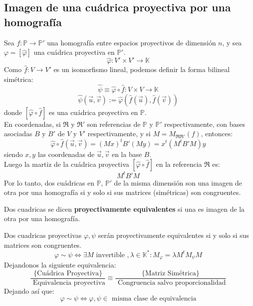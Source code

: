 \subsection{Imagen de una cuádrica proyectiva por una homografía}

Sea $f : \mathbb{P} \to \mathbb{P}'$ una homografía entre espacios proyectivos de dimensión $n$, y sea $\varphi = [\hat{\varphi}]$ una cuádrica proyectiva en $\mathbb{P}'$.
\[
    \hat{\varphi} : V' \times V' \to \mathbb{K}
\] 
Como $\hat{f} : V \to V'$ es un isomorfismo lineal, podemos definir la forma bilineal simétrica:
\[
    \hat{\psi} \equiv \hat{\varphi} \circ \hat{f} : V \times V \to \mathbb{K}
\]
\[
    \hat{\psi} (\vec{u}, \vec{v}) := \hat{\varphi} (\hat{f}(\vec{u}), \hat{f}(\vec{v}))
\]
donde $[\hat{\varphi} \circ \hat{f}]$ es una cuádrica proyectiva en $\mathbb{P}$.\\
En coordenadas, si $\mathfrak{R}$ y $\mathfrak{R}'$ son referencias de $\mathbb{P}$ y $\mathbb{P}'$ respectivamente, con bases asociadas $B$ y $B'$ de $V$ y $V'$ respectivamente, y si $M = M_{\mathfrak{R} \mathfrak{R}'} (f)$, entonces:
\[
    \hat{\varphi} \circ \hat{f} (\vec{u}, \vec{v}) = (M x)^t B' (M y) = x^t (M^t B' M) y
\]
siendo $x,y$ las coordenadas de $\vec{u}, \vec{v}$ en la base $B$.\\
Luego la martiz de la cuádrica proyectiva $[\hat{\varphi} \circ \hat{f}]$ en la referencia $\mathfrak{R}$ es:
\[
    M^t B' M
\]
Por lo tanto, dos cuádricas en $\mathbb{P}$, $\mathbb{P}'$ de la misma dimensión son una imagen de otra por una homografía si y solo si sus matrices (simétricas) son congruentes.

\begin{definición}
    Dos cuadricas se dicen \textbf{proyectivamente equivalentes} si una es imagen de la otra por una homografía.
\end{definición}

\begin{observación}
    Dos cuadricas proyectivas $\varphi, \psi$ serán proyectivamente equivalentes si y solo si sus matrices son congruentes.
    \[
        \varphi \sim \psi \iff
        \exists M \text{ invertible }, \lambda \in \mathbb{K}^* :
        M_{\varphi} = \lambda M^t M_{\psi} M
    \]
    Dejandonos la siguiente equivalencia:
    \[
        \frac{ \{ \text{Cuádrica Proyectiva} \} }{ \text{ Equivalencia proyectiva} }
        \equiv
        \frac{ \{ \text{Matriz Simétrica} \} }{ \text{ Congruencia salvo proporcionalidad} }
    \]
    Dejando así que:
    \[
    \varphi \sim \psi \iff
    \varphi, \psi \in \text{ misma clase de equivalencia}
    \]
\end{observación}

